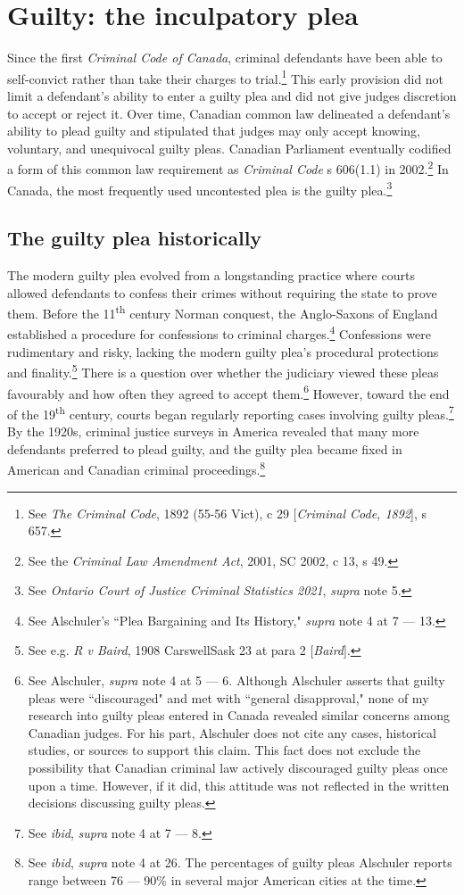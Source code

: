 \section{Guilty: the inculpatory plea}

Since the first \textit{Criminal Code of Canada}, criminal defendants have been able to self-convict rather than take their charges to trial.\footnote{See \textit{The Criminal Code}, 1892 (55-56 Vict), c 29 [\textit{Criminal Code, 1892}], s 657.} This early provision did not limit a defendant's ability to enter a guilty plea and did not give judges discretion to accept or reject it. Over time, Canadian common law delineated a defendant's ability to plead guilty and stipulated that judges may only accept knowing, voluntary, and unequivocal guilty pleas. Canadian Parliament eventually codified a form of this common law requirement as \textit{Criminal Code} s 606(1.1) in 2002.\footnote{See the \textit{Criminal Law Amendment Act}, 2001, SC 2002, c 13, s 49.} In Canada, the most frequently used uncontested plea is the guilty plea.\footnote{See \textit{Ontario Court of Justice Criminal Statistics 2021}, \textit{supra} note 5.}

\subsection{The guilty plea historically}

The modern guilty plea evolved from a longstanding practice where courts allowed defendants to confess their crimes without requiring the state to prove them. Before the 11\textsuperscript{th} century Norman conquest, the Anglo-Saxons of England established a procedure for confessions to criminal charges.\footnote{See Alschuler's ``Plea Bargaining and Its History," \textit{supra} note 4 at 7 — 13.} Confessions were rudimentary and risky, lacking the modern guilty plea's procedural protections and finality.\footnote{See e.g. \textit{R v Baird}, 1908 CarswellSask 23 at para 2 [\textit{Baird}].} There is a question over whether the judiciary viewed these pleas favourably and how often they agreed to accept them.\footnote{See Alschuler, \textit{supra} note 4 at 5 — 6. Although Alschuler asserts that guilty pleas were ``discouraged" and met with ``general disapproval," none of my research into guilty pleas entered in Canada revealed similar concerns among Canadian judges. For his part, Alschuler does not cite any cases, historical studies, or sources to support this claim. This fact does not exclude the possibility that Canadian criminal law actively discouraged guilty pleas once upon a time. However, if it did, this attitude was not reflected in the written decisions discussing guilty pleas.} However, toward the end of the 19\textsuperscript{th} century, courts began regularly reporting cases involving guilty pleas.\footnote{See \textit{ibid}, \textit{supra} note 4 at 7 — 8.} By the 1920s, criminal justice surveys in America revealed that many more defendants preferred to plead guilty, and the guilty plea became fixed in American and Canadian criminal proceedings.\footnote{See \textit{ibid}, \textit{supra} note 4 at 26. The percentages of guilty pleas Alschuler reports range between 76 — 90\% in several major American cities at the time.}

